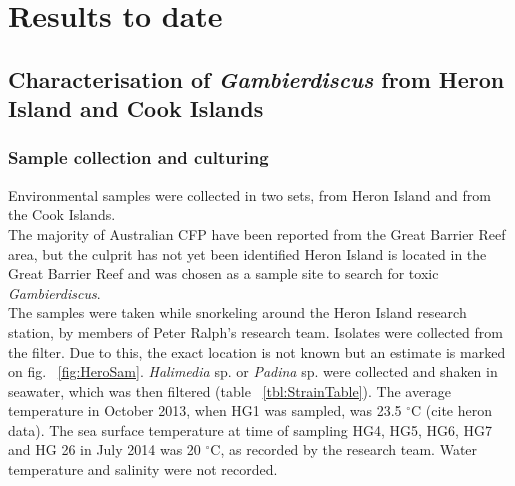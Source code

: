 \documentclass[12pt]{article}
\begin{document}
\section{Results to date}

\subsection{Characterisation of \emph{Gambierdiscus} from Heron Island and Cook Islands}

\subsubsection{Sample collection and culturing}
Environmental samples were collected in two sets, from Heron Island and from the Cook Islands.\\

The majority of Australian CFP have been reported from the Great Barrier Reef area, but the culprit has not yet been identified \cite{lewis2006ciguatera} Heron Island is located in the Great Barrier Reef and was chosen as a sample site to search for toxic \emph{Gambierdiscus}.\\ 
The samples were taken while snorkeling around the Heron Island research station, by members of Peter Ralph's research team. Isolates were collected from the filter. Due to this, the exact location is not known but an estimate is marked on fig. ~\ref{fig:HeroSam}. \emph{Halimedia} sp. or \emph{Padina} sp. were collected and shaken in seawater, which was then filtered (table ~\ref{tbl:StrainTable}). The average temperature in October 2013, when HG1 was sampled, was 23.5 $^{\circ}$C (cite heron data). The sea surface temperature at time of sampling HG4, HG5, HG6, HG7 and HG 26 in July 2014 was 20 $^{\circ}$C, as recorded by the research team. Water temperature and salinity were not recorded.
\end{document}

